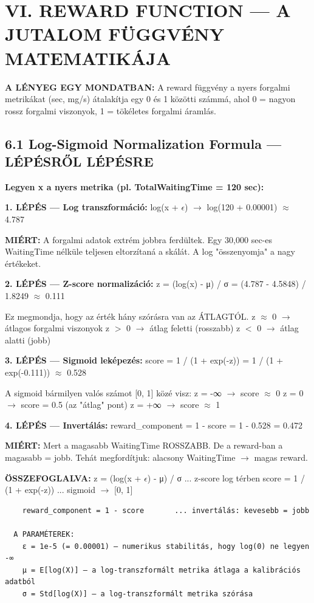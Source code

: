 \documentclass[11pt,a4paper]{article}
\begin{document}
\section*{VI. REWARD FUNCTION — A JUTALOM FÜGGVÉNY MATEMATIKÁJA}

\textbf{A LÉNYEG EGY MONDATBAN:}
A reward függvény a nyers forgalmi metrikákat (sec, mg/s)
átalakítja egy 0 és 1 közötti számmá, ahol 0 = nagyon rossz
forgalmi viszonyok, 1 = tökéletes forgalmi áramlás.

\subsection*{6.1 Log-Sigmoid Normalization Formula — LÉPÉSRŐL LÉPÉSRE}
\textbf{Legyen x a nyers metrika (pl. TotalWaitingTime = 120 sec):}

\textbf{1. LÉPÉS — Log transzformáció:}
log(x + $\epsilon$) $\rightarrow$ log(120 + 0.00001) $\approx$ 4.787

\textbf{MIÉRT:} A forgalmi adatok extrém jobbra ferdültek.
Egy 30,000 sec-es WaitingTime nélküle teljesen eltorzítaná a skálát.
A log "összenyomja" a nagy értékeket.

\textbf{2. LÉPÉS — Z-score normalizáció:}
z = (log(x) - μ) / σ = (4.787 - 4.5848) / 1.8249 $\approx$ 0.111

Ez megmondja, hogy az érték hány szórásra van az ÁTLAGTÓL.
z $\approx$ 0 $\rightarrow$ átlagos forgalmi viszonyok
z $>$ 0 $\rightarrow$ átlag feletti (rosszabb)
z $<$ 0 $\rightarrow$ átlag alatti (jobb)

\textbf{3. LÉPÉS — Sigmoid leképezés:}
score = 1 / (1 + exp(-z)) = 1 / (1 + exp(-0.111)) $\approx$ 0.528

A sigmoid bármilyen valós számot [0, 1] közé visz:
z = -∞ $\rightarrow$ score $\approx$ 0
z = 0  $\rightarrow$ score = 0.5 (az "átlag" pont)
z = +∞ $\rightarrow$ score $\approx$ 1

\textbf{4. LÉPÉS — Invertálás:}
reward\_component = 1 - score = 1 - 0.528 = 0.472

\textbf{MIÉRT:} Mert a magasabb WaitingTime ROSSZABB.
De a reward-ban a magasabb = jobb.
Tehát megfordítjuk: alacsony WaitingTime $\rightarrow$ magas reward.

\textbf{ÖSSZEFOGLALVA:}
z = (log(x + $\epsilon$) - μ) / σ          ... z-score log térben
score = 1 / (1 + exp(-z))          ... sigmoid $\rightarrow$ [0, 1]
\vspace{1em}\begin{verbatim}
    reward_component = 1 - score       ... invertálás: kevesebb = jobb

  A PARAMÉTEREK:
    ε = 1e-5 (= 0.00001) — numerikus stabilitás, hogy log(0) ne legyen -∞
    μ = E[log(X)] — a log-transzformált metrika átlaga a kalibrációs adatból
    σ = Std[log(X)] — a log-transzformált metrika szórása

\end{verbatim}
\end{document}
